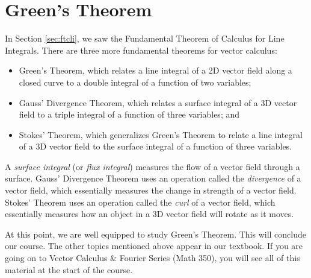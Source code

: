 \newlecture

\setcounter{section}{6}

\def\coursetopicnumber{IV}
\def\topic{Green's Theorem} %
\def\shorttopic{Green's Theorem} %
\def\textbookname{Active Calculus} %
\def\shorttextbookname{AC} %
\def\textbooksection{12.7} %
\def\textbooksectionurl{https://activecalculus.org/vector/S_Vector_GreensTheorem.html} %
\def\handoutday{} %


\thispagestyle{plain}
\topstuff
\section{\topic{} \booklink{}}
\label{sec:greens-theorem}
In Section \ref{sec:ftcli}, we saw the Fundamental Theorem of Calculus for Line Integrals. There are three more fundamental theorems for vector calculus:
\begin{itemize}
    \item Green's Theorem, which relates a line integral of a 2D vector field along a closed curve to a double integral of a function of two variables;
    \item Gauss' Divergence Theorem, which relates a surface integral of a 3D vector field to a triple integral of a function of three variables; and
    \item Stokes' Theorem, which generalizes Green's Theorem to relate a line integral of a 3D vector field to the surface integral of a function of three variables.
\end{itemize}
A \emph{surface integral} (or \emph{flux integral}) measures the flow of a vector field through a surface. Gauss' Divergence Theorem uses an operation called the \emph{divergence} of a vector field, which essentially measures the change in strength of a vector field. Stokes' Theorem uses an operation called the \emph{curl} of a vector field, which essentially measures how an object in a 3D vector field will rotate as it moves. 

At this point, we are well equipped to study Green's Theorem. This will conclude our course. The other topics mentioned above appear in our textbook. If you are going on to Vector Calculus \& Fourier Series (Math 350), you will see all of this material at the start of the course.

